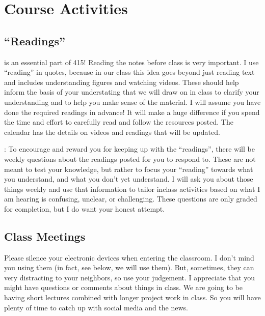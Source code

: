 \documentclass[letterpaper,10pt,english]{jupyterBook}
\begin{document}
\section{Course Activities}
\label{\detokenize{content/0_course/design:course-activities}}

\subsection{“Readings”}
\label{\detokenize{content/0_course/design:readings}}
\sphinxAtStartPar
{} is an essential part of 415! Reading the notes before class is very important. I use “reading” in quotes, because in our class this idea goes beyond just reading text and includes understanding figures and watching videos. These should help inform the basis of your understating that we will draw on in class to clarify your understanding and to help you make sense of the material. I will assume you have done the required readings in advance! It will make a huge difference if you spend the time and effort to carefully read and follow the resources posted. The calendar has the details on videos and readings that will be updated.

\sphinxAtStartPar
{}: To encourage and reward you for keeping up with the “readings”, there will be weekly questions about the readings posted for you to respond to. These are not meant to test your knowledge, but rather to focus your “reading” towards what you understand, and what you don’t yet understand. I will ask you about those things weekly and use that information to tailor in\sphinxhyphen{}class activities based on what I am hearing is confusing, unclear, or challenging. These questions are only graded for completion, but I do want your honest attempt.


\subsection{Class Meetings}
\label{\detokenize{content/0_course/design:class-meetings}}
\sphinxAtStartPar
{} Please silence your electronic devices when entering the classroom. I don’t mind you using them (in fact, see below, we will use them). But, sometimes, they can very distracting to your neighbors, so use your judgement. I appreciate that you might have questions or comments about things in class. We are going to be having short lectures combined with longer project work in class. So you will have plenty of time to catch up with social media and the news.
\end{document}
